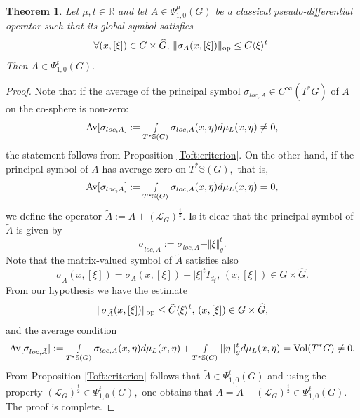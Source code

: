 \documentclass[12pt, reqno]{amsart}
\newtheorem{theorem}{Theorem}[section]
\theoremstyle{definition}
\theoremstyle{remark}
\numberwithin{equation}{section}
\begin{document}
\begin{theorem}\label{Toft:criterion:II}
    Let $\mu,t\in \mathbb{R}$ and let $A\in \Psi^{\mu}_{1,0}(G)$ be a classical pseudo-differential operator such that its global symbol satisfies
    \begin{equation}\label{growth:t}
      \forall(x,[\xi])\in G\times \widehat{G},\,  \Vert \sigma_A(x,[\xi])\Vert_{\textnormal{op}}\leq C\langle\xi\rangle^{t}.
    \end{equation}Then $A\in \Psi^{t}_{1,0}(G).$ 
\end{theorem}\begin{proof}
    Note that if  the average of the principal symbol $\sigma_{loc,A}\in C^\infty(T^*G)$ of $A$ on the co-sphere is non-zero:
\begin{equation}
    \textnormal{Av}[\sigma_{loc,A}]:=\smallint\limits_{ T^{*}\mathbb{S}(G)}\sigma_{loc,A}(x,\eta)d\mu_{L}(x,\eta)\neq 0,
\end{equation} the statement follows from  Proposition \ref{Toft:criterion}. On the other hand, if the principal symbol of $A$ has average zero on $T^*\mathbb{S}(G),$ that is, \begin{equation}
    \textnormal{Av}[\sigma_{loc,A}]:=\smallint\limits_{ T^{*}\mathbb{S}(G)}\sigma_{loc,A}(x,\eta)d\mu_{L}(x,\eta)= 0,
\end{equation}we define the operator $\tilde A:=A+(\mathcal{L}_G)^{\frac{t}{2}}.$ Is it clear that the principal symbol of $\tilde{A}$ is given by
$$  \sigma_{loc, \tilde A}:= \sigma_{loc,  A}+\Vert \xi\Vert_{g}^{t}. $$ Note that the matrix-valued symbol of $\tilde A$ satisfies also 
\begin{equation}
  \sigma_{\tilde A}(x,[\xi])=  \sigma_{ A}(x,[\xi])+|\xi|^tI_{d_\xi},\,(x,[\xi])\in G\times \widehat{G}.
\end{equation}From our hypothesis we have  the estimate
\begin{equation*}
    \Vert\sigma_{\tilde A}(x,[\xi])\Vert_{\textnormal{op}}\leq \tilde C\langle\xi \rangle^t, \,(x,[\xi])\in G\times \widehat{G},
\end{equation*}and the average condition 
\begin{equation}
    \textnormal{Av}[\sigma_{loc,\tilde A}]:=\smallint\limits_{ T^{*}\mathbb{S}(G)}\sigma_{loc,A}(x,\eta)d\mu_{L}(x,\eta)+\smallint\limits_{ T^{*}\mathbb{S}(G)}||\eta||_g^{t}d\mu_{L}(x,\eta)=\textnormal{Vol}(T^*G)\neq  0.
\end{equation}From Proposition  \ref{Toft:criterion} follows that $\tilde A \in \Psi^{t}_{1,0}(G)$ and using the property $ (\mathcal{L}_G)^{\frac{t}{2}} \in \Psi^{t}_{1,0}(G),$ one obtains that $A=\tilde A-(\mathcal{L}_G)^{\frac{t}{2}} \in \Psi^{t}_{1,0}(G).$ The proof is complete.
\end{proof}
\end{document}
